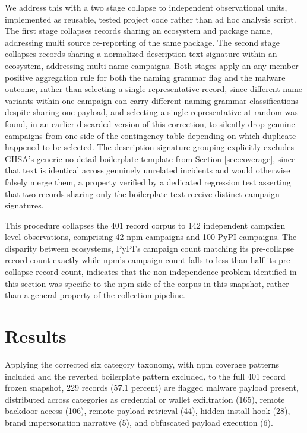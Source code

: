 \documentclass[journal]{IEEEtran}
\begin{document}
We address this with a two stage collapse to independent observational units, implemented as reusable, tested project code rather than ad hoc analysis script. The first stage collapses records sharing an ecosystem and package name, addressing multi source re-reporting of the same package. The second stage collapses records sharing a normalized description text signature within an ecosystem, addressing multi name campaigns. Both stages apply an any member positive aggregation rule for both the naming grammar flag and the malware outcome, rather than selecting a single representative record, since different name variants within one campaign can carry different naming grammar classifications despite sharing one payload, and selecting a single representative at random was found, in an earlier discarded version of this correction, to silently drop genuine campaigns from one side of the contingency table depending on which duplicate happened to be selected. The description signature grouping explicitly excludes GHSA's generic no detail boilerplate template from Section \ref{sec:coverage}, since that text is identical across genuinely unrelated incidents and would otherwise falsely merge them, a property verified by a dedicated regression test asserting that two records sharing only the boilerplate text receive distinct campaign signatures.

This procedure collapses the 401 record corpus to 142 independent campaign level observations, comprising 42 npm campaigns and 100 PyPI campaigns. The disparity between ecosystems, PyPI's campaign count matching its pre-collapse record count exactly while npm's campaign count falls to less than half its pre-collapse record count, indicates that the non independence problem identified in this section was specific to the npm side of the corpus in this snapshot, rather than a general property of the collection pipeline.

\section{Results}
\label{sec:results}

Applying the corrected six category taxonomy, with npm coverage patterns included and the reverted boilerplate pattern excluded, to the full 401 record frozen snapshot, 229 records (57.1 percent) are flagged malware payload present, distributed across categories as credential or wallet exfiltration (165), remote backdoor access (106), remote payload retrieval (44), hidden install hook (28), brand impersonation narrative (5), and obfuscated payload execution (6).
\end{document}
